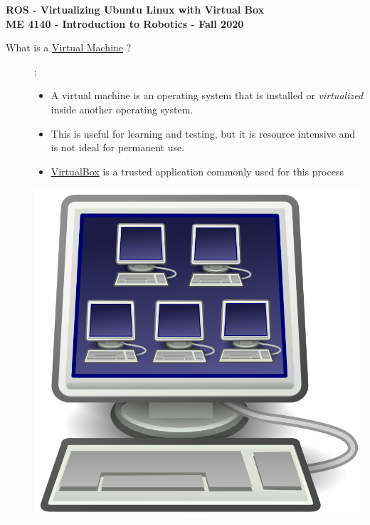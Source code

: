 \documentclass[12pt]{article}
\begin{document}
\thispagestyle{plain}

\begin{center}
   {\bf \Large ROS - Virtualizing Ubuntu Linux with Virtual Box}\vspace{3mm} \\
   {\bf \large ME 4140 - Introduction to Robotics - Fall 2020} \vspace{5mm}\\
\end{center}


\begin{description}

 	\item[What is a \href{https://en.wikipedia.org/wiki/Virtual_machine}{Virtual Machine} ?]: \\
 	\begin{multicols}{2}
      		
            \begin{itemize}
                
                \item A virtual machine is an operating system that is installed or {\it virtualized} inside another operating system.
                \item This is useful for learning and testing, but it is resource intensive and is not ideal for permanent use. 
                \item \href{https://www.virtualbox.org/}{VirtualBox} is a trusted application commonly used for this process
                
            \end{itemize}
            \includegraphics[scale=.15]{CaptureA.png}\\
	\end{multicols}
	

\end{description}
\end{document}
